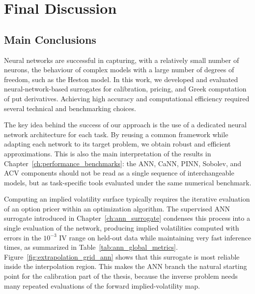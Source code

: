 \chapter{Final Discussion}
\label{ch:conclusions}

\section{Main Conclusions}

Neural networks are successful in capturing, with a relatively small number of neurons, the behaviour of complex models with a large number of degrees of freedom, such as the Heston model. In this work, we developed and evaluated neural-network-based surrogates for calibration, pricing, and Greek computation of put derivatives. Achieving high accuracy and computational efficiency required several technical and benchmarking choices.

The key idea behind the success of our approach is the use of a dedicated neural network architecture for each task. By reusing a common framework while adapting each network to its target problem, we obtain robust and efficient approximations. This is also the main interpretation of the results in Chapter~\ref{ch:performance_benchmarks}: the ANN, CaNN, PINN, Sobolev, and ACV components should not be read as a single sequence of interchangeable models, but as task-specific tools evaluated under the same numerical benchmark.

Computing an implied volatility surface typically requires the iterative evaluation of an option pricer within an optimization algorithm. The supervised ANN surrogate introduced in Chapter~\ref{ch:ann_surrogate} condenses this process into a single evaluation of the network, producing implied volatilities computed with errors in the \(10^{-3}\) IV range on held-out data while maintaining very fast inference times, as summarized in Table~\ref{tab:ann_global_metrics}. Figure~\ref{fig:extrapolation_grid_ann} shows that this surrogate is most reliable inside the interpolation region. This makes the ANN branch the natural starting point for the calibration part of the thesis, because the inverse problem needs many repeated evaluations of the forward implied-volatility map.

